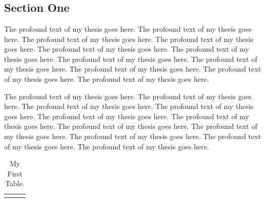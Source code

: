 \chapter{}\label{ch:one}

\section{Section One}

The profound text of my thesis goes here. The profound text of my thesis
goes here. The profound text of my thesis goes here. The profound text of my
thesis goes here. The profound text of my thesis goes here. The profound
text of my thesis goes here. The profound text of my thesis goes here. The
profound text of my thesis goes here. The profound text of my thesis goes
here. The profound text of my thesis goes here. The profound text of my
thesis goes here.

The profound text of my thesis goes here. The profound text of my thesis
goes here. The profound text of my thesis goes here. The profound text of my
thesis goes here. The profound text of my thesis goes here. The profound
text of my thesis goes here. The profound text of my thesis goes here. The
profound text of my thesis goes here. The profound text of my thesis goes
here. The profound text of my thesis goes here. The profound text of my
thesis goes here.

\begin{table}[H]   %
\centering
\begin{tabularx}{\textwidth}{|X|X|X|}
\hline
 & & \\ \hline
 & & \\ \hline
\end{tabularx}
\caption{My First Table.}\label{tab:first}
\end{table}


